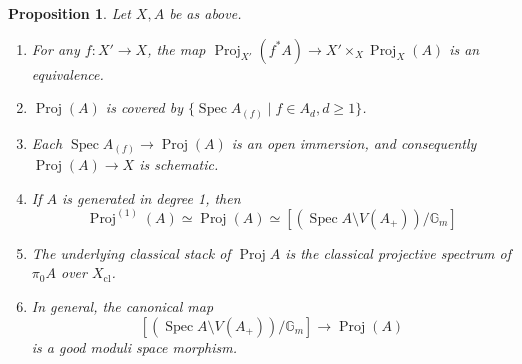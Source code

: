 \documentclass[a4paper,twoside,11pt]{amsart}
\theoremstyle{plain}
\newtheorem{proposition}[theorem]{Proposition}
\theoremstyle{definition}
\theoremstyle{remark}
\numberwithin{equation}{section}
\newcommand{\GG}{\mathbb{G}} %
\DeclareMathOperator{\Spec}{Spec} %
\DeclareMathOperator{\Proj}{Proj} %
\newcommand{\cl}{\mathrm{cl}} %
\begin{document}
\begin{proposition} Let $X,A$ be as above.
\label{Prop:Proj}
    \begin{enumerate}
        \item For any $f \colon X' \to X$, the map $\Proj_{X'}(f^*A) \to X' \times_X \Proj_X (A)$ is an equivalence.
        \item $\Proj (A)$ is covered by $\{\Spec  A_{(f)} \mid f \in A_d, d \geq 1 \}$. 
        \item Each $\Spec A_{(f)} \to \Proj (A)$ is an open immersion, and consequently $\Proj(A) \to X$ is schematic.
        \item If $A$ is generated in degree 1, then
        \[ \Proj^{(1)} (A) \simeq \Proj (A) \simeq [ (\Spec  A \setminus V(A_+)) / \GG_m ] \]
        \item The underlying classical stack of $\Proj A$ is the classical projective spectrum of $\pi_0A$ over $X_\cl$.        
        \item In general, the canonical map
        \[ [ (\Spec  A \setminus V(A_+)) / \GG_m ] \to \Proj (A) \]
        is a good moduli space morphism.
    \end{enumerate}
\end{proposition}
\end{document}
